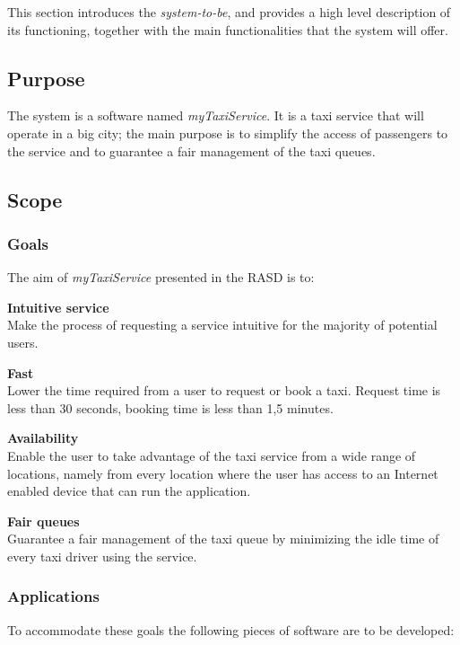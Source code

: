 This section introduces the \emph{system-to-be}, and provides a high level description of its functioning, together with the main functionalities that the system will offer.


\subsection{Purpose}

The system is a software named \emph{myTaxiService}. It is a taxi service that will operate in a big city; the main purpose is to simplify the access of passengers to the service and to guarantee a fair management of the taxi queues.

\subsection{Scope}
\label{sub:scope}
\subsubsection{Goals} %
\label{ssub:goals}
The aim of \emph{myTaxiService} presented in the RASD is to:
\begin{enumerate} [label = \textbf{[G\arabic*]}]
\item \textbf{Intuitive service}\hfill \\
\label{goal:intuitive}
Make the process of requesting a service intuitive for the majority of potential users.
\item \textbf{Fast}\hfill \\
\label{goal:time}
Lower the time required from a user to request or book a taxi. Request time is less than 30 seconds, booking time is less than 1,5 minutes.
\item \textbf{Availability}\hfill \\
\label{goal:availability}
Enable the user to take advantage of the taxi service from a wide range of locations, namely from every location where the user has access to an Internet enabled device that can run the application.
\item \textbf{Fair queues}\hfill \\
\label{goal:queue}
Guarantee a fair management of the taxi queue by minimizing the idle time of every taxi driver using the service.
\end{enumerate}

\subsubsection{Applications} %
\label{ssub:applications}
To accommodate these goals the following pieces of software are to be developed:

